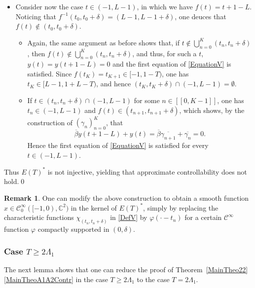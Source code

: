 \documentclass[10pt]{amsart}
\newcommand{\llbracket}{[\![}
\newcommand{\rrbracket}{]\!]}
\theoremstyle{plain}
\theoremstyle{definition}
\newtheorem{remk}[theo]{Remark}
\begin{document}
\begin{itemize}
\item
Consider now the case $t \in (-1, L - 1)$, in which we have $f(t) = t + 1 - L$.
Noticing that $f^{-1}(t_0, t_0 + \delta) = (L-1, L-1+\delta)$, one deuces that \hbox{$f(t) \notin (t_0, t_0 + \delta)$}.
\begin{itemize}
\item
Again, the same argument as before shows that, if $t \notin \bigcup_{n=0}^K (t_n, t_n + \delta)$, then \hbox{$f(t) \notin \bigcup_{n=0}^K (t_n, t_n + \delta)$}, and thus, for such a $t$, $y(t) = y(t + 1 - L) = 0$ and the first equation of \eqref{EquationV} is satisfied. Since $f(t_K) = t_{K + 1} \in [-1, 1 - T)$, one has $t_K \in [L - 1, 1 + L - T)$, and hence $(t_K, t_K + \delta) \cap (-1, L-1) = \emptyset$.
\item
If $t \in (t_n, t_n + \delta) \cap (-1, L-1)$ for some $n \in \llbracket 0, K-1\rrbracket$, one has $t_n \in (-1, L-1)$ and $f(t) \in (t_{n+1}, t_{n+1} + \delta)$, which shows, by the construction of $(\gamma_n)_{n=0}^K$, that
\[
\overline\beta y(t + 1 - L) + y(t) = \overline\beta \overline{\gamma_{n+1}} + \overline{\gamma_{n}} = 0.
\]
Hence the first equation of \eqref{EquationV} is satisfied for every $t \in (-1, L - 1)$.
\end{itemize}
\end{itemize}

Thus $E(T)^\ast$ is not injective, yielding that approximate controllability does not hold.\qed

\begin{remk}
One can modify the above construction to obtain a smooth function $x \in \mathcal C^\infty_0([-1, 0), \mathbb C^2)$ in the kernel of $E(T)^\ast$, simply by replacing the characteristic functions $\chi_{(t_n, t_n + \delta)}$ in \eqref{DefV} by $\varphi(\cdot - t_n)$ for a certain $\mathcal C^\infty$ function $\varphi$ compactly supported in $(0, \delta)$.
\end{remk}

\subsubsection{\texorpdfstring{Case $T \geq 2 \Lambda_1$}{Case T >= 2 Lambda1}}

The next lemma shows that one can reduce the proof of Theorem~\ref{MainTheo22}\eqref{MainTheoA1A2Contr} in the case $T \geq 2 \Lambda_1$ to the case $T = 2 \Lambda_1$.
\end{document}
